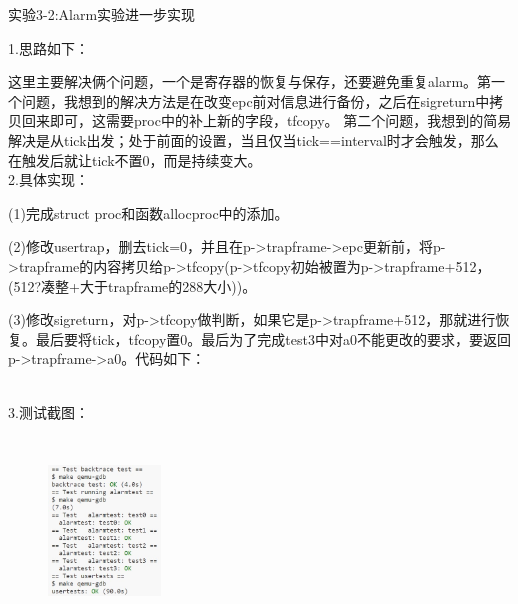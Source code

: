 \documentclass[12pt]{article}
\begin{document}
\newpage
\begin{Large}
	\noindent 实验3-2:Alarm实验进一步实现\\
\end{Large}
1.思路如下：\par
这里主要解决俩个问题，一个是寄存器的恢复与保存，还要避免重复alarm。第一个问题，我想到的解决方法是在改变epc前对信息进行备份，之后在sigreturn中拷贝回来即可，这需要proc中的补上新的字段，tfcopy。
第二个问题，我想到的简易解决是从tick出发；处于前面的设置，当且仅当tick==interval时才会触发，那么在触发后就让tick不置0，而是持续变大。\\
2.具体实现：\par
(1)完成struct proc和函数allocproc中的添加。\par
(2)修改usertrap，删去tick=0，并且在p->trapframe->epc更新前，将p->trapframe的内容拷贝给p->tfcopy(p->tfcopy初始被置为p->trapframe+512，(512?凑整+大于trapframe的288大小))。\par
(3)修改sigreturn，对p->tfcopy做判断，如果它是p->trapframe+512，那就进行恢复。最后要将tick，tfcopy置0。最后为了完成test3中对a0不能更改的要求，要返回p->trapframe->a0。代码如下：
\begin{figure}[!h]
    \centering
    \hfill
\end{figure}\\
3.测试截图：
\begin{figure}[H]
    \centering
    \includegraphics[height=5cm,width=3cm]{lab4-3.jpg}
\end{figure}
\end{document}
